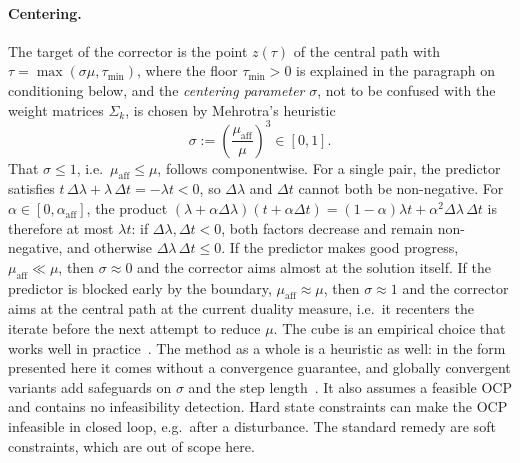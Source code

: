 \paragraph{Centering.}
The target of the corrector is the point $z(\tau)$ of the central path with $\tau = \max(\sigma\mu, \tau_{\min})$, where the floor $\tau_{\min} > 0$ is explained in the paragraph on conditioning below, and the \textit{centering parameter} $\sigma$, not to be confused with the weight matrices $\Sigma_k$, is chosen by Mehrotra's heuristic
\[
    \sigma := \left( \frac{\mu_{\text{aff}}}{\mu} \right)^3 \in [0, 1] .
\]
That $\sigma \leq 1$, i.e.\ $\mu_{\text{aff}} \leq \mu$, follows componentwise.
For a single pair, the predictor satisfies $t\, \Delta\lambda + \lambda\, \Delta t = -\lambda t < 0$, so $\Delta\lambda$ and $\Delta t$ cannot both be non-negative.
For $\alpha \in [0, \alpha_{\text{aff}}]$, the product $(\lambda + \alpha\Delta\lambda)(t + \alpha\Delta t) = (1-\alpha)\lambda t + \alpha^2 \Delta\lambda\, \Delta t$ is therefore at most $\lambda t$: if $\Delta\lambda, \Delta t < 0$, both factors decrease and remain non-negative, and otherwise $\Delta\lambda\, \Delta t \leq 0$.
If the predictor makes good progress, $\mu_{\text{aff}} \ll \mu$, then $\sigma \approx 0$ and the corrector aims almost at the solution itself.
If the predictor is blocked early by the boundary, $\mu_{\text{aff}} \approx \mu$, then $\sigma \approx 1$ and the corrector aims at the central path at the current duality measure, i.e.\ it recenters the iterate before the next attempt to reduce $\mu$.
The cube is an empirical choice that works well in practice~\cite{mehrotra1992implementation}.
The method as a whole is a heuristic as well: in the form presented here it comes without a convergence guarantee, and globally convergent variants add safeguards on $\sigma$ and the step length~\cite{wright1997primal,nocedal2006numerical}.
It also assumes a feasible OCP and contains no infeasibility detection.
Hard state constraints can make the OCP infeasible in closed loop, e.g.\ after a disturbance.
The standard remedy are soft constraints, which are out of scope here.

